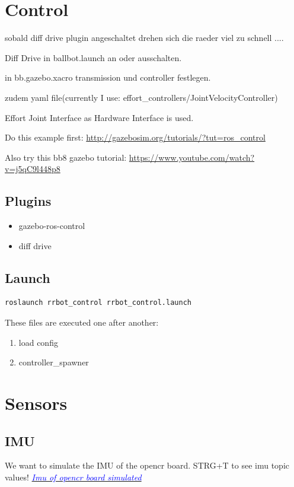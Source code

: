 \documentclass[twoside,colorback,accentcolor=tud4c,11pt]{tudreport}
\newcommand{\mylink}[2] {	\hyperlink{#1}{	\textit{\textcolor{blue}{#2}}}}
\begin{document}
	
	\section{Control}
	sobald diff drive plugin angeschaltet drehen sich die raeder viel zu schnell ....
	
	Diff Drive in ballbot.launch an oder ausschalten. 
	
	in bb.gazebo.xacro transmission und controller festlegen.
	
	zudem yaml file(currently I use: effort\_controllers/JointVelocityController)
	
	Effort Joint Interface as Hardware Interface is used.
	
	Do this example first: \url{http://gazebosim.org/tutorials/?tut=ros_control}
	
	Also try this bb8 gazebo tutorial: \url{https://www.youtube.com/watch?v=j5qC9l448p8}
	
	\subsection{Plugins}
	\begin{itemize}
		\item gazebo-ros-control
		\item diff drive
	\end{itemize}
	
	\subsection{Launch}
	\begin{lstlisting}[style=BashInputStyle]
	roslaunch rrbot_control rrbot_control.launch
	\end{lstlisting}
	
	These files are executed one after another:
	\begin{enumerate}
		\item load config
		\item controller\_spawner
	\end{enumerate}
	
	\section{Sensors}
	\subsection{IMU}
	
		We want to simulate the IMU of the opencr board. STRG+T to see imu topic values!
	\mylink{https://www.youtube.com/watch?v=wXN_7oRHst0}{Imu of opencr board simulated}
\end{document}
